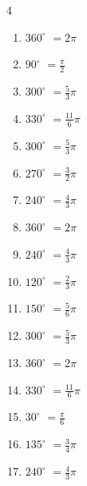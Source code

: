\begin{multicols}{4}
\begin{enumerate}
  \item $\displaystyle 360^{\circ}$
        $\displaystyle =2\pi$

  \item $\displaystyle 90^{\circ}$
        $\displaystyle =\frac{\pi}{2}$

  \item $\displaystyle 300^{\circ}$
        $\displaystyle =\frac{5}{3}\pi$

  \item $\displaystyle 330^{\circ}$
        $\displaystyle =\frac{11}{6}\pi$

  \item $\displaystyle 300^{\circ}$
        $\displaystyle =\frac{5}{3}\pi$

  \item $\displaystyle 270^{\circ}$
        $\displaystyle =\frac{3}{2}\pi$

  \item $\displaystyle 240^{\circ}$
        $\displaystyle =\frac{4}{3}\pi$

  \item $\displaystyle 360^{\circ}$
        $\displaystyle =2\pi$

  \item $\displaystyle 240^{\circ}$
        $\displaystyle =\frac{4}{3}\pi$

  \item $\displaystyle 120^{\circ}$
        $\displaystyle =\frac{2}{3}\pi$

  \item $\displaystyle 150^{\circ}$
        $\displaystyle =\frac{5}{6}\pi$

\columnbreak %

  \item $\displaystyle 300^{\circ}$
        $\displaystyle =\frac{5}{3}\pi$

  \item $\displaystyle 360^{\circ}$
        $\displaystyle =2\pi$

  \item $\displaystyle 330^{\circ}$
        $\displaystyle =\frac{11}{6}\pi$

  \item $\displaystyle 30^{\circ}$
        $\displaystyle =\frac{\pi}{6}$

  \item $\displaystyle 135^{\circ}$
        $\displaystyle =\frac{3}{4}\pi$

  \item $\displaystyle 240^{\circ}$
        $\displaystyle =\frac{4}{3}\pi$


\end{enumerate}
\end{multicols}
